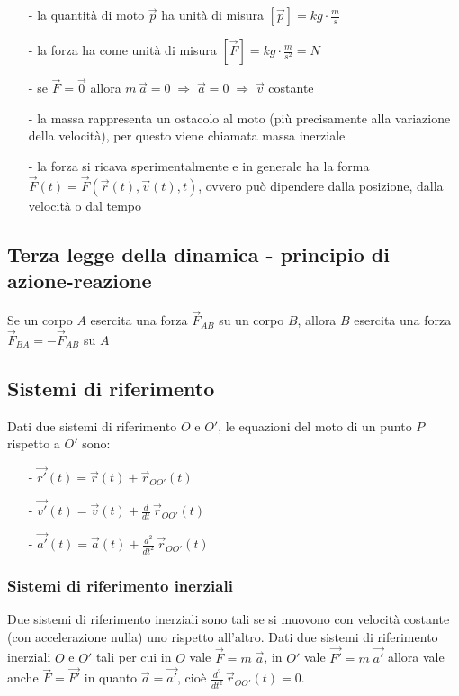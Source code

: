\documentclass[a4paper]{article}
\newcommand\dt{\frac{d}{dt}\,}
\newcommand\dts{\frac{d^2}{dt^2}\,}
\begin{document}
\begin{itemize}[topsep=3pt, itemsep=0pt]
	\item[-] la quantità di moto \(\vec{p}\) ha unità di misura \(\displaystyle \left[\vec{p}\right] = kg \cdot \frac{m}{s}\)
	\item[-] la forza ha come unità di misura \(\displaystyle \left[\vec{F}\right] = kg \cdot \frac{m}{s^2} = N\)
	\item[-] se \(\vec{F} = \vec{0}\) allora \(m \, \vec{a} = 0 \; \Rightarrow \; \vec{a} = 0 \; \Rightarrow \; \vec{v}\) costante
	\item[-] la massa rappresenta un ostacolo al moto (più precisamente alla variazione della velocità), per questo viene chiamata massa inerziale
	\item[-] la forza si ricava sperimentalmente e in generale ha la forma \(\vec{F}(t) = \vec{F}(\vec{r}(t), \vec{v}(t), t)\), ovvero può dipendere
	dalla posizione, dalla velocità o dal tempo
\end{itemize}

\subsection{Terza legge della dinamica - principio di azione-reazione}
Se un corpo \(A\) esercita una forza \(\vec{F}_{AB}\) su un corpo \(B\), allora \(B\) esercita una forza \(\vec{F}_{BA} = -\vec{F}_{AB}\) su \(A\)

\subsection{Sistemi di riferimento}
Dati due sistemi di riferimento \(O\) e \(O'\), le equazioni del moto di un punto \(P\) rispetto a \(O'\) sono:
\begin{itemize}[topsep=3pt, itemsep=0pt]
	\item[-] \(\vec{r'}(t) = \vec{r}(t) + \vec{r}_{OO'}(t)\)
	\item[-] \(\displaystyle\vec{v'}(t) = \vec{v}(t) + \dt \vec{r}_{OO'}(t)\)
	\item[-] \(\displaystyle\vec{a'}(t) = \vec{a}(t) + \dts \vec{r}_{OO'}(t)\)
\end{itemize}

\subsubsection*{Sistemi di riferimento inerziali}
Due sistemi di riferimento inerziali sono tali se si muovono con velocità costante (con accelerazione nulla) uno rispetto all'altro.
Dati due sistemi di riferimento inerziali \(O\) e \(O'\) tali per cui in \(O\) vale \(\vec{F} = m \; \vec{a}\), in \(O'\) vale \(\vec{F'} = m \; \vec{a'}\)
allora vale anche \(\vec{F} = \vec{F'}\) in quanto \(\vec{a} = \vec{a'}\), cioè \(\displaystyle \dts \vec{r}_{OO'}(t) = 0\).
\end{document}
